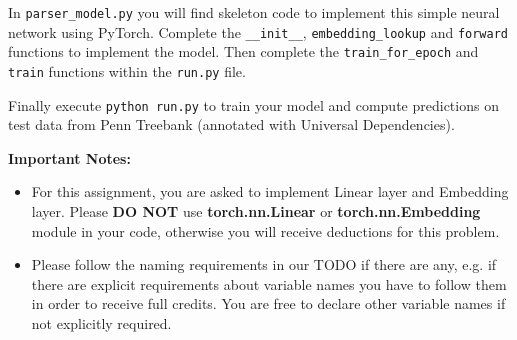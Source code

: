 \begin{parts}
   In \texttt{parser\_model.py} you will find skeleton code to implement this simple neural network using PyTorch. Complete the \texttt{\_\_init\_\_}, \texttt{embedding\_lookup} and \texttt{forward} functions to implement the model. Then complete the \texttt{train\_for\_epoch} and \texttt{train} functions within the \texttt{run.py} file.
   
    Finally execute \texttt{python run.py} to train your model and compute predictions
    on test data from Penn Treebank (annotated with Universal Dependencies). 
    
    \textbf{Important Notes:}
    \begin{itemize}
        \item For this assignment, you are asked to implement Linear layer and Embedding layer. Please \textbf{DO NOT} use \textbf{torch.nn.Linear} or  \textbf{torch.nn.Embedding} module in your code, otherwise you will receive deductions for this problem. 
        \item Please follow the naming requirements in our TODO if there are any, e.g. if there are explicit requirements about variable names you have to follow them in order to receive full credits. You are free to declare other variable names if not explicitly required. 
    \end{itemize}
    

\end{parts}
